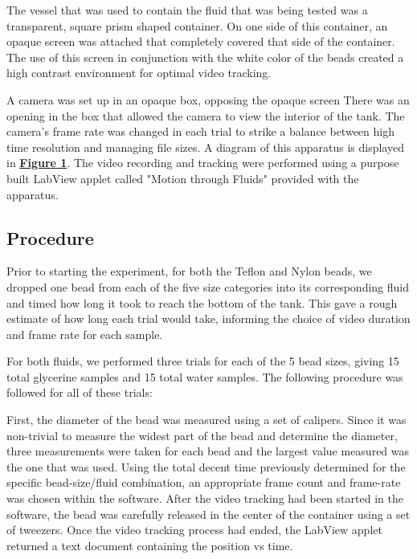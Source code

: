 \documentclass[
	letterpaper
	12pt
]{template}
\newcommand{\bref}[2]{\textbf{\hyperref[#1]{#2}}}
\begin{document}
The vessel that was used to contain the fluid that was being tested was a transparent, square prism shaped container. On one side of this container, an opaque screen was attached that completely covered that side of the container. The use of this screen in conjunction with the white color of the beads created a high contrast environment for optimal video tracking. \vspace{\baselineskip}

A camera was set up in an opaque box, opposing the opaque screen There was an opening in the box that allowed the camera to view the interior of the tank. The camera's frame rate was changed in each trial to strike a balance between high time resolution and managing file sizes. A diagram of this apparatus is displayed in \bref{fig::apparatus}{Figure 1}. The video recording and tracking were performed using a purpose built LabView applet called "Motion through Fluids" provided with the apparatus.
\subsection{Procedure}
Prior to starting the experiment, for both the Teflon and Nylon beads, we dropped one bead from each of the five size categories into its corresponding fluid and timed how long it took to reach the bottom of the tank. This gave a rough estimate of how long each trial would take, informing the choice of video duration and frame rate for each sample.\vspace{\baselineskip}

For both fluids, we performed three trials for each of the 5 bead sizes, giving 15 total glycerine samples and 15 total water samples. The following procedure was followed for all of these trials: \vspace{\baselineskip}

First, the diameter of the bead was measured using a set of calipers. Since it was non-trivial to measure the widest part of the bead and determine the diameter, three measurements were taken for each bead and the largest value measured was the one that was used. Using the total decent time previously determined for the specific bead-size/fluid combination, an appropriate frame count and frame-rate was chosen within the software. After the video tracking had been started in the software, the bead was carefully released in the center of the container using a set of tweezers. Once the video tracking process had ended, the LabView applet returned a text document containing the position vs time.
\vspace{\baselineskip}
\end{document}
